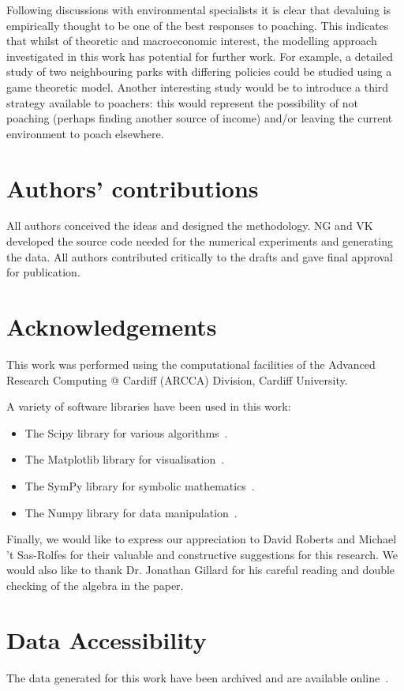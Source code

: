 \documentclass[10pt]{article}
\begin{document}
Following discussions with environmental specialists it is clear that devaluing
is empirically thought to be one of the best responses to poaching. This
indicates that whilst of theoretic and macroeconomic interest, the modelling
approach investigated in this work has potential for further work. For example,
a detailed study of two neighbouring parks with differing policies could be
studied using a game theoretic model. Another interesting study would be to
introduce a third strategy available to poachers: this would represent the
possibility of not poaching (perhaps finding another source of income) and/or
leaving the current environment to poach elsewhere.

\section*{Authors' contributions}

All authors conceived the ideas and designed the methodology. NG and VK developed the
source code needed for the numerical experiments and generating the data. All authors
contributed critically to the drafts and gave final approval for publication.

\section*{Acknowledgements}

This work was performed using the computational facilities of the Advanced
Research Computing @ Cardiff (ARCCA) Division, Cardiff University.

A variety of software libraries have been used in this work:

\begin{itemize}
    \item The Scipy library for various algorithms~\cite{scipy}.
    \item The Matplotlib library for visualisation~\cite{hunter2007matplotlib}.
    \item The SymPy library for symbolic mathematics~\cite{sympy}.
    \item The Numpy library for data manipulation~\cite{walt2011numpy}.
\end{itemize}

Finally, we would like to express our appreciation to David Roberts and Michael 't
Sas-Rolfes for their valuable and constructive suggestions for this research.
We would also like to thank
Dr. Jonathan Gillard for his careful reading and double checking of the algebra in the paper.

\section*{Data Accessibility}

The data generated for this work have been archived and are available
online~\cite{Glynatsi2017}.



\end{document}
